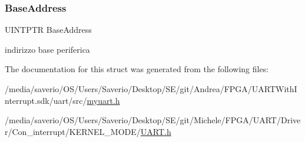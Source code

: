 \subsubsection{\texorpdfstring{Base\+Address}{BaseAddress}}
{\footnotesize\ttfamily U\+I\+N\+T\+P\+TR Base\+Address}

indirizzo base periferica 

The documentation for this struct was generated from the following files\+:\begin{DoxyCompactItemize}
\item 
/media/saverio/\+O\+S/\+Users/\+Saverio/\+Desktop/\+S\+E/git/\+Andrea/\+F\+P\+G\+A/\+U\+A\+R\+T\+With\+Interrupt.\+sdk/uart/src/\hyperlink{myuart_8h}{myuart.\+h}\item 
/media/saverio/\+O\+S/\+Users/\+Saverio/\+Desktop/\+S\+E/git/\+Michele/\+F\+P\+G\+A/\+U\+A\+R\+T/\+Driver/\+Con\+\_\+interrupt/\+K\+E\+R\+N\+E\+L\+\_\+\+M\+O\+D\+E/\hyperlink{UART_8h}{U\+A\+R\+T.\+h}\end{DoxyCompactItemize}
